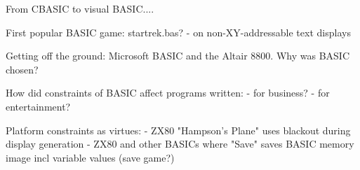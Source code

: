 From CBASIC to visual BASIC....


First popular BASIC game: startrek.bas?
  - on non-XY-addressable text displays

Getting off the ground: Microsoft BASIC and the Altair 8800.  Why was
    BASIC chosen?


How did constraints of BASIC affect programs written:
- for business?
- for entertainment?



Platform constraints as virtues:
 - ZX80 "Hampson's Plane" uses blackout during display generation 
 - ZX80 and other BASICs where "Save" saves BASIC memory image incl
 variable values (save game?)
